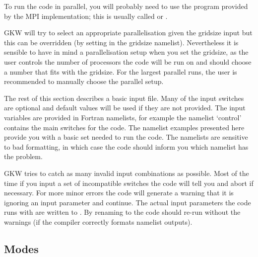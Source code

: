 To run the code in parallel, you will probably need to use the program provided by the
MPI implementation; this is usually called  or .

GKW will try to select an appropriate parallelisation given the gridsize input but this can be overridden 
(by setting  in the gridsize namelist).  Nevertheless it is
sensible to have in mind a parallelisation setup when you set the gridsize, as the user controls the number of 
processors the code will be run on and should choose a number that fits with the
gridsize.  For the largest parallel runs, the user is recommended to manually choose the parallel setup.

The rest of this section describes a basic input file.
Many of the input switches are optional and default values will be used if they are not provided.
The input variables are provided in Fortran namelists, for example the namelist `control' contains
the main switches for the code. The namelist examples presented here provide you with a basic set 
needed to run the code.  The namelists are sensitive to bad formatting, in which case the code should 
inform you which namelist has the problem.  

GKW tries to catch as many invalid input combinations as possible. Most of the time if you input a set of 
incompatible switches the code will tell you and abort if necessary. For more minor errors the code will generate 
a warning that it is ignoring an input parameter and continue.  The actual input parameters the code runs with are 
written to .  By renaming  to  the code should re-run without the warnings
(if the compiler correctly formats namelist outputs).

\subsection{Modes}

